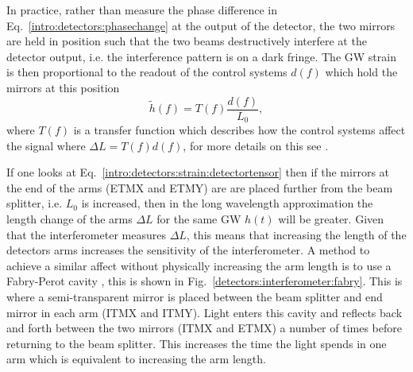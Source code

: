 In practice, rather than measure the phase difference in
Eq.~\ref{intro:detectors:phasechange} at the output of the detector, the two mirrors are held in position such that the two beams destructively interfere at the detector output, i.e. the interference pattern is on a dark fringe.
%
%
The \gls{GW} strain is then proportional to the readout of the control systems $d(f)$ which hold the mirrors at this position \cite{ligoscientificcollaboration2017CalibrationAdvanced} 
\begin{equation}
    \tilde{h}(f) = T(f) \frac{d(f)}{L_0},
\end{equation}
where $T(f)$ is a transfer function which describes how the control systems affect the signal where $\Delta L = T(f) d(f)$, for more details on this see \cite{ligoscientificcollaboration2017CalibrationAdvanced}.

If one looks at Eq.~\ref{intro:detectors:strain:detectortensor} then if the mirrors at the
end of the arms (\gls{ETMX} and \gls{ETMY}) are are placed
further from the beam splitter, i.e. $L_0$ is increased, then in the long wavelength approximation the length change
of the arms $\Delta L$ for the same \gls{GW} $h(t)$ will be greater.  Given that the interferometer measures $\Delta L$, this means that
increasing the length of the detectors arms increases the sensitivity of the
interferometer.  A method to achieve a similar affect without physically
increasing the arm length is to use a Fabry-Perot cavity
\citep{aasi2015AdvancedLIGO}, this is shown in
Fig.~\ref{detectors:interferometer:fabry}.  This is where a semi-transparent
mirror is placed between the beam splitter and end mirror in each arm (\gls{ITMX} and
\gls{ITMY}).  Light enters this cavity and reflects
back and forth between the two mirrors (\gls{ITMX} and \gls{ETMX}) a number of times before
returning to the beam splitter.  This increases the time the light spends in
one arm which is equivalent to increasing the arm length.  

